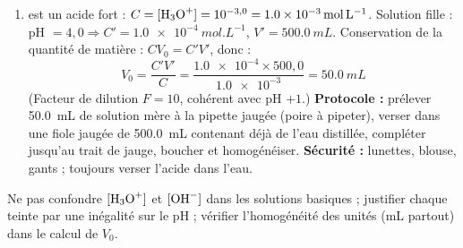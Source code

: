 \documentclass[11pt]{article}
\begin{document}
\begin{corrige}
\begin{enumerate}
    \item {} est un acide fort : $C = [\ce{H3O+}] = 10^{-3,0} = \SI{1,0e-3}{mol.L^{-1}}$.
    Solution fille : pH $= 4{,}0 \Rightarrow C' = \SI{1,0e-4}{mol.L^{-1}}$, $V' = \SI{500,0}{mL}$.
    Conservation de la quantité de matière : $C V_0 = C' V'$, donc :
    \[ V_0 = \frac{C' V'}{C} = \frac{\num{1,0e-4} \times 500{,}0}{\num{1,0e-3}} = \SI{50,0}{mL} \]
    (Facteur de dilution $F = 10$, cohérent avec pH $+1$.)
    \textbf{Protocole :} prélever \SI{50,0}{mL} de solution mère à la pipette jaugée (poire à pipeter), verser dans une fiole jaugée de \SI{500,0}{mL} contenant déjà de l'eau distillée, compléter jusqu'au trait de jauge, boucher et homogénéiser. \textbf{Sécurité :} lunettes, blouse, gants ; toujours verser l'acide dans l'eau.
\end{enumerate}

\begin{attention}
Ne pas confondre $[\ce{H3O+}]$ et $[\ce{OH-}]$ dans les solutions basiques ; justifier chaque teinte par une inégalité sur le pH ; vérifier l'homogénéité des unités (mL partout) dans le calcul de $V_0$.
\end{attention}
\end{corrige}
\end{document}
